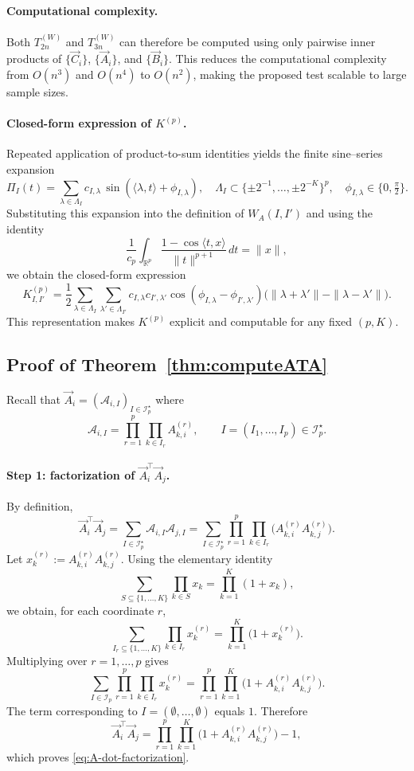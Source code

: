 \documentclass[12pt,reqno,oneside]{amsbook}
\theoremstyle{definition}
\theoremstyle{remark}
\begin{document}
\paragraph{Computational complexity.}
Both $T_{2n}^{(W)}$ and $T_{3n}^{(W)}$ can therefore be computed using only
pairwise inner products of $\{\vec C_i\}$, $\{\vec A_i\}$, and $\{\vec B_i\}$.
This reduces the computational complexity from $O(n^3)$ and $O(n^4)$ to
$O(n^2)$, making the proposed test scalable to large sample sizes.

\paragraph{Closed-form expression of $K^{(p)}$.}
Repeated application of product-to-sum identities yields the finite
sine--series expansion
\[
\Pi_I(t)
=
\sum_{\lambda\in\Lambda_I}
c_{I,\lambda}\,
\sin(\langle\lambda,t\rangle+\phi_{I,\lambda}),
\quad
\Lambda_I\subset\{\pm 2^{-1},\dots,\pm 2^{-K}\}^p,
\quad
\phi_{I,\lambda}\in\{0,\tfrac{\pi}{2}\}.
\]
Substituting this expansion into the definition of $W_A(I,I')$ and using
the identity
\[
\frac{1}{c_p}
\int_{\mathbb R^p}
\frac{1-\cos\langle t,x\rangle}{\|t\|^{p+1}}\,dt
=
\|x\|,
\]
we obtain the closed-form expression
\[
K^{(p)}_{I,I'}
=
\frac{1}{2}
\sum_{\lambda\in\Lambda_I}\sum_{\lambda'\in\Lambda_{I'}}
c_{I,\lambda}c_{I',\lambda'}
\cos(\phi_{I,\lambda}-\phi_{I',\lambda'})
\bigl(\|\lambda+\lambda'\|-\|\lambda-\lambda'\|\bigr).
\]
This representation makes $K^{(p)}$ explicit and computable for any fixed
$(p,K)$.

\subsection{Proof of Theorem~\ref{thm:computeATA}}
\label{proof_theorem2.2}
Recall that $\vec A_i=(\mathcal A_{i,I})_{I\in\mathcal I_p^\star}$ where
\[
\mathcal A_{i,I}
=
\prod_{r=1}^p\prod_{k\in I_r} A^{(r)}_{k,i},
\qquad I=(I_1,\dots,I_p)\in\mathcal I_p^\star.
\]

\paragraph{Step 1: factorization of $\vec A_i^\top \vec A_j$.}
By definition,
\[
\vec A_i^\top \vec A_j
=
\sum_{I\in\mathcal I_p^\star} \mathcal A_{i,I}\mathcal A_{j,I}
=
\sum_{I\in\mathcal I_p^\star}
\prod_{r=1}^p\prod_{k\in I_r}\bigl(A^{(r)}_{k,i}A^{(r)}_{k,j}\bigr).
\]
Let $x^{(r)}_k:=A^{(r)}_{k,i}A^{(r)}_{k,j}$.
Using the elementary identity
\[
\sum_{S\subseteq\{1,\dots,K\}} \prod_{k\in S} x_k
=
\prod_{k=1}^K (1+x_k),
\]
we obtain, for each coordinate $r$,
\[
\sum_{I_r\subseteq\{1,\dots,K\}}\prod_{k\in I_r} x^{(r)}_k
=
\prod_{k=1}^K \bigl(1+x^{(r)}_k\bigr).
\]
Multiplying over $r=1,\dots,p$ gives
\[
\sum_{I\in\mathcal I_p}\prod_{r=1}^p\prod_{k\in I_r} x^{(r)}_k
=
\prod_{r=1}^p\prod_{k=1}^K \bigl(1+A^{(r)}_{k,i}A^{(r)}_{k,j}\bigr).
\]
The term corresponding to $I=(\emptyset,\dots,\emptyset)$ equals $1$. 
Therefore
\[
\vec A_i^\top \vec A_j
=
\prod_{r=1}^p\prod_{k=1}^K \bigl(1+A^{(r)}_{k,i}A^{(r)}_{k,j}\bigr)-1,
\]
which proves \eqref{eq:A-dot-factorization}.
\end{document}

